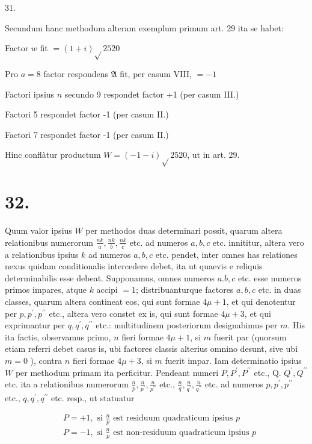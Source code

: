 \documentclass[10pt]{article}
\begin{document}
31.

Secundum hanc methodum alteram exemplum primum art. 29 ita se habet:

Factor \(w\) fit \(=(1+i) \sqrt{ } 2520\)

Pro \(a=8\) factor respondens \(\mathfrak{A}\) fit, per casum VIII, \(=-1\)

Factori ipsius \(n\) secundo 9 respondet factor +1 (per casum III.)

Factori 5 respondet factor -1 (per casum II.)

Factori 7 respondet factor -1 (per casum II.)

Hinc conflàtur productum \(W=(-1-i) \sqrt{ } 2520\), ut in art. 29.

\section*{32.}
Quum valor ipsius \(W\) per methodos duas determinari possit, quarum altera relationibus numerorum \(\frac{n k}{a}, \frac{n k}{b}, \frac{n k}{c}\) etc. ad numeros \(a, b, c\) etc. innititur, altera vero a relationibus ipsius \(k\) ad numeros \(a, b, c\) etc. pendet, inter omnes has relationes nexus quidam conditionalis intercedere debet, ita ut quaevis e reliquis determinabilis esse debeat. Supponamus, omnes numeros \(a . b, c\) etc. esse numeros primos impares, atque \(k\) accipi \(=1\); distribuanturque factores \(a, b, c\) etc. in duas classes, quarum altera contineat eos, qui sunt formae \(4 \mu+1\), et qui denotentur per \(p, p^{\prime}, p^{\prime \prime}\) etc., altera vero constet ex is, qui sunt formae \(4 \mu+3\), et qui exprimantur per \(q, q^{\prime}, q^{\prime \prime}\) etc.: multitudinem posteriorum designabimus per \(m\). His ita factis, observamus primo, \(n\) fieri formae \(4 \mu+1\), si \(m\) fuerit par (quorsum etiam referri debet casus is, ubi factores classis alterius omnino desunt, sive ubi \(m=0\) ), contra \(n\) fieri formae \(4 \mu+3\), si \(m\) fuerit impar. Iam determinatio
ipsius \(W\) per methodum primam ita perficitur. Pendeant numeri \(P, P^{\prime}, P^{\prime \prime}\) etc., Q. \(Q^{\prime}, Q^{\prime \prime}\) etc. ita a relationibus numerorum \(\frac{n}{p}, \frac{n}{p^{\prime}}, \frac{n}{p^{\prime \prime}}\) etc., \(\frac{n}{q}, \frac{n}{q^{\prime}}, \frac{n}{q^{\prime \prime}}\) etc. ad numeros \(p, p^{\prime}, p^{\prime \prime}\) etc., \(q, q^{\prime}, q^{\prime \prime}\) etc. resp., ut statuatur

\[
\begin{aligned}
& P=+1, \text { si } \frac{n}{p} \text { est residuum quadraticum ipsius } p \\
& P=-1, \text { si } \frac{n}{p} \text { est non-residuum quadraticum ipsius } p
\end{aligned}
\]
\end{document}
